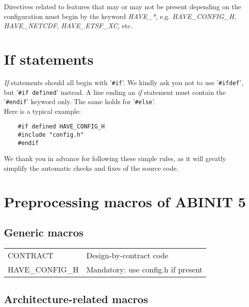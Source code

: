 Directives related to features that may or may not be present depending
on the configuration must begin by the keyword \textit{HAVE\_*}, e.g.
\textit{HAVE\_CONFIG\_H}, \textit{HAVE\_NETCDF},
\textit{HAVE\_ETSF\_XC}, etc.



\section{If statements}

\textit{If} statements should all begin with '\texttt{\#if}'. We kindly
ask you not to use '\texttt{\#ifdef}', but \hbox{'\texttt{\#if defined}'}
instead. A line ending an \textit{if} statement must contain the
'\texttt{\#endif}' keyword only. The same holds for '\texttt{\#else}'.
\\

Here is a typical example:

{\small
\begin{verbatim}
    #if defined HAVE_CONFIG_H
    #include "config.h"
    #endif
\end{verbatim}
}

We thank you in advance for following these simple rules, as it will greatly
simplify the automatic checks and fixes of the source code.



\section{Preprocessing macros of ABINIT 5}

\subsection{Generic macros}

\begin{center}
 \begin{tabular}{l l}
  CONTRACT & Design-by-contract code \\
  HAVE\_CONFIG\_H & Mandatory: use config.h if present \\
 \end{tabular}
\end{center}



\subsection{Architecture-related macros}

